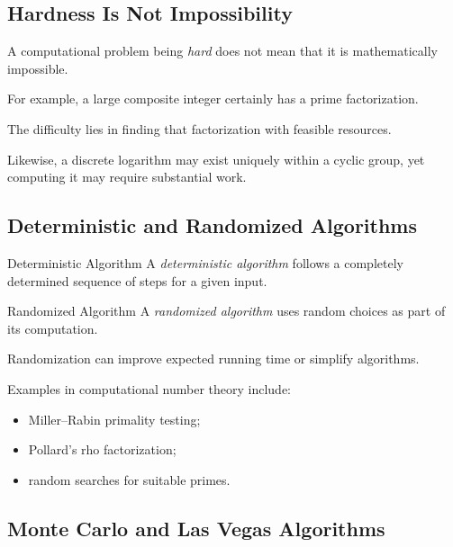 \subsection{Hardness Is Not Impossibility}
\label{subsec:hardness-not-impossibility}

A computational problem being \emph{hard} does not mean that it is
mathematically impossible.

For example, a large composite integer certainly has a prime factorization.

The difficulty lies in finding that factorization with feasible resources.

Likewise, a discrete logarithm may exist uniquely within a cyclic group, yet
computing it may require substantial work.

\subsection{Deterministic and Randomized Algorithms}
\label{subsec:deterministic-randomized-number-theory}

\begin{definitionbox}{Deterministic Algorithm}
A \emph{deterministic algorithm} follows a completely determined sequence of
steps for a given input.
\end{definitionbox}

\begin{definitionbox}{Randomized Algorithm}
A \emph{randomized algorithm} uses random choices as part of its computation.
\end{definitionbox}

Randomization can improve expected running time or simplify algorithms.

Examples in computational number theory include:

\begin{itemize}
    \item Miller--Rabin primality testing;
    \item Pollard's rho factorization;
    \item random searches for suitable primes.
\end{itemize}

\subsection{Monte Carlo and Las Vegas Algorithms}
\label{subsec:monte-carlo-las-vegas}

